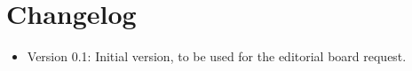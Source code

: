 \section{Changelog}

\begin{itemize}
\item Version 0.1: Initial version, to be used for the editorial board request.
\end{itemize}
